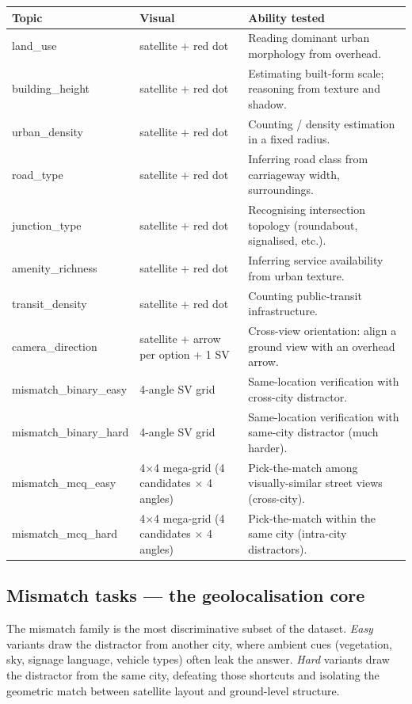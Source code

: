 \documentclass[11pt,a4paper]{article}
\begin{document}
\renewcommand{\arraystretch}{1.2}
\begin{tabularx}{\linewidth}{@{}>{\ttfamily\small}l p{4.6cm} X@{}}
\toprule
\textnormal{\textbf{Topic}} & \textbf{Visual} & \textbf{Ability tested} \\
\midrule
land\_use         & satellite + red dot              & Reading dominant urban morphology from overhead. \\
building\_height  & satellite + red dot              & Estimating built-form scale; reasoning from texture and shadow. \\
urban\_density    & satellite + red dot              & Counting / density estimation in a fixed radius. \\
road\_type        & satellite + red dot              & Inferring road class from carriageway width, surroundings. \\
junction\_type    & satellite + red dot              & Recognising intersection topology (roundabout, signalised, etc.). \\
amenity\_richness & satellite + red dot              & Inferring service availability from urban texture. \\
transit\_density  & satellite + red dot              & Counting public-transit infrastructure. \\
camera\_direction & satellite + arrow per option + 1 SV & Cross-view orientation: align a ground view with an overhead arrow. \\
mismatch\_binary\_easy & 4-angle SV grid             & Same-location verification with cross-city distractor. \\
mismatch\_binary\_hard & 4-angle SV grid             & Same-location verification with same-city distractor (much harder). \\
mismatch\_mcq\_easy    & 4$\times$4 mega-grid (4 candidates $\times$ 4 angles) & Pick-the-match among visually-similar street views (cross-city). \\
mismatch\_mcq\_hard    & 4$\times$4 mega-grid (4 candidates $\times$ 4 angles) & Pick-the-match within the same city (intra-city distractors). \\
\bottomrule
\end{tabularx}

\subsection{Mismatch tasks --- the geolocalisation core}
The mismatch family is the most discriminative subset of the dataset.
\emph{Easy} variants draw the distractor from another city, where
ambient cues (vegetation, sky, signage language, vehicle types) often
leak the answer. \emph{Hard} variants draw the distractor from the
same city, defeating those shortcuts and isolating the geometric
match between satellite layout and ground-level structure.
\end{document}

